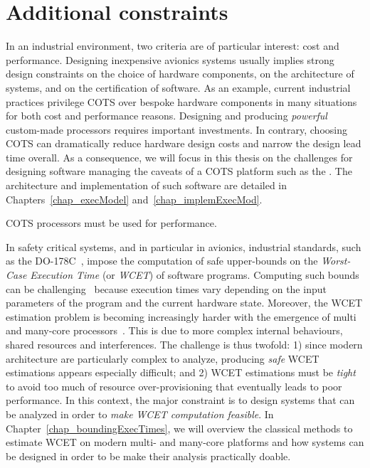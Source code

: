 \documentclass[main.tex]{subfiles}
\begin{document}
\section{Additional constraints}
\label{sec_systemModel_additionalConstraints}
In an industrial environment, two criteria are of particular interest: cost and performance. Designing inexpensive avionics systems usually implies strong design constraints on the choice of hardware components, 
on the architecture of systems, and on the certification of software. 
As an example, current industrial practices privilege COTS over bespoke hardware components in many situations for both cost and performance reasons. Designing and producing \emph{powerful} custom-made processors requires important investments. In contrary, choosing COTS can dramatically reduce hardware design costs and narrow the design lead time overall. As a consequence, we will focus in this thesis on the challenges for designing software managing the caveats of a COTS platform such as the \mppalong. The architecture and implementation of such software are detailed in Chapters~\ref{chap_execModel} and~\ref{chap_implemExecMod}. 

\begin{constraint}
    \label{constr_cotsOnly}
    COTS processors must be used for performance.
\end{constraint}


In safety critical systems, and in particular in avionics, industrial standards, such as the DO-178C~\cite{do178}, impose the computation of safe upper-bounds on the \emph{Worst-Case Execution Time} (or \emph{WCET}) of software programs. Computing such bounds can be challenging~\cite{Wilhelm2008} because execution times vary depending on the input parameters of the program and the current hardware state. Moreover, the WCET estimation problem is becoming increasingly harder with the emergence of multi and many-core processors~\cite{Wilhelm2012}. This is due to more complex internal behaviours, shared resources and interferences. The challenge is thus twofold: 1) since modern architecture are particularly complex to analyze, producing \emph{safe} WCET estimations appears especially difficult; and 2) WCET estimations must be \emph{tight} to avoid too much of resource over-provisioning that eventually leads to poor performance. In this context, the major constraint is to design systems that can be analyzed in order to \emph{make WCET computation feasible}. In Chapter~\ref{chap_boundingExecTimes}, we will overview the classical methods to estimate WCET on modern multi- and many-core platforms and how systems can be designed in order to be make their analysis practically doable.
\end{document}
